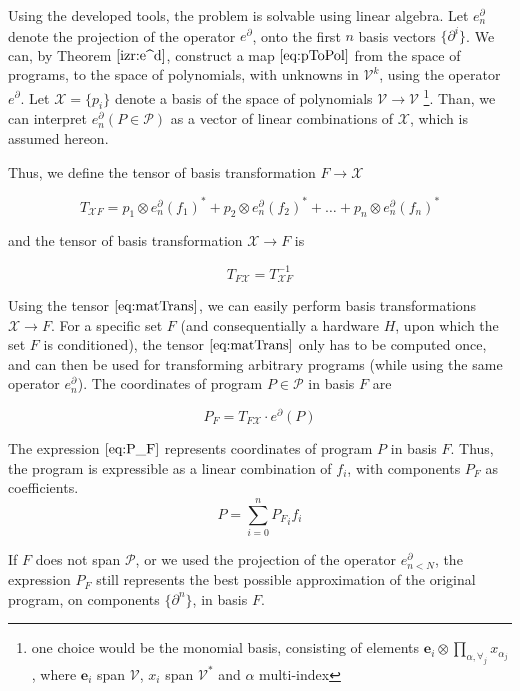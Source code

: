 \documentclass[smallcondensed]{svjour3}
\newcommand{\VV}{\mathcal{V}}
\newcommand{\e}{\mathbf{e}}
\newcommand{\X}{\mathcal{X}}
\newcommand{\dP}{\mathcal{P}}
\newcommand{\D}{\partial}
\begin{document}
   Using the developed tools, the problem is solvable using linear algebra. Let
   $e^\D_n$ denote the projection of the operator $e^\D$, onto the first $n$
   basis vectors $\{\D^i\}$. We can, by Theorem $\ref{izr:e^d}$, construct a map
   $\eqref{eq:pToPol}$ from the space of programs, to the space of polynomials,
   with unknowns in $\VV^k$, using the operator $e^\D$. Let $\X=\{p_i\}$ denote a basis of
   the space of polynomials $\VV\to \VV$ \footnote{one choice would be the monomial basis,
   consisting of elements $\e_i\otimes\prod\limits_{\alpha,\forall_j}
   x_{\alpha_j}$, where $\e_i$ span $\VV$, $x_i$ span $\VV^*$ and $\alpha$
   multi-index}. Than, we can interpret $e^\D_n(P\in\dP)$ as a vector of linear combinations of $\X$, which is assumed hereon.
  
  Thus, we define the tensor of basis transformation $F\to\X$
  
  \begin{equation}\label{eq:matTransF}
  T_{\X F}=
  p_1\otimes e_n^\D(f_1)^* + p_2\otimes e_n^\D(f_2)^* + \ldots + p_n\otimes e_n^\D(f_n)^*
  \end{equation}
  
  and the tensor of basis transformation $\X\to F$ is
  
  \begin{equation}\label{eq:matTrans}
  T_{F\X}=T_{\X F}^{-1}
  \end{equation}
  
  Using the tensor $\eqref{eq:matTrans}$, we can easily perform basis transformations $\X\to F$. For a specific set $F$ (and consequentially a hardware $H$, upon which the set $F$ is conditioned), the tensor $\eqref{eq:matTrans}$ only has to be computed once, and can then be used for transforming arbitrary programs (while using the same operator $e^\D_n$).
  The coordinates of program $P\in\dP$ in basis $F$ are
  
  \begin{equation}\label{eq:P_F}
  	P_F=T_{F\X}\cdot e^\D(P)
  \end{equation}
  
  The expression $\eqref{eq:P_F}$ represents coordinates of program $P$ in basis $F$. Thus, the program is expressible as a linear combination of $f_i$, with components $P_F$ as coefficients.
  \begin{equation}
  P=\sum\limits_{i=0}^{n}{P_F}_if_i
  \end{equation}
  
  If $F$ does not span $\dP$, or we used the projection of the operator $e^\D_{n<N}$, the expression $P_F$ still represents the best possible approximation of the original program, on components $\{\D^n\}$, in basis $F$.
  
\end{document}
